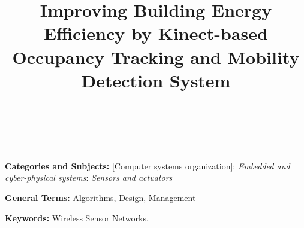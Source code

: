 \documentclass[preprint]{sig-alternate}
\begin{document}
\title{Improving Building Energy Efficiency by Kinect-based Occupancy
  Tracking and Mobility Detection System}

\author{\alignauthor  \ \\
 \\
}


\makeatletter
\let\@copyrightspace\relax
\makeatother

\pagestyle{plain}
\thispagestyle{plain}

\maketitle


\begin{abstract}

\end{abstract}


\noindent
{\bf Categories and Subjects:} {[Computer systems organization]}: {\em Embedded and cyber-physical systems}: {\em Sensors and actuators}

\noindent
{\bf General Terms: }Algorithms, Design, Management


\noindent
{\bf Keywords: }Wireless Sensor Networks.
\\














\end{document}

